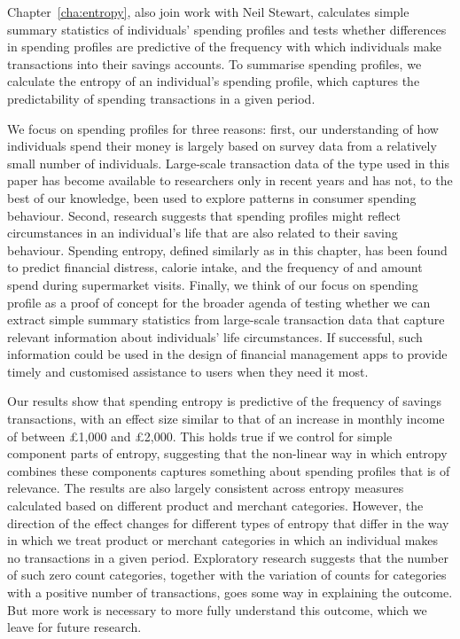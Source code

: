 Chapter~\ref{cha:entropy}, also join work with Neil Stewart, calculates simple
summary statistics of individuals' spending profiles and tests whether
differences in spending profiles are predictive of the frequency with which
individuals make transactions into their savings accounts. To summarise
spending profiles, we calculate the entropy of an individual's spending profile, which captures the predictability of spending transactions
in a given period.

We focus on spending profiles for three reasons: first, our understanding of
how individuals spend their money is largely based on survey data from a
relatively small number of individuals. Large-scale transaction data of the
type used in this paper has become available to researchers only in recent
years and has not, to the best of our knowledge, been used to explore patterns
in consumer spending behaviour. Second, research suggests that spending
profiles might reflect circumstances in an individual's life that are also
related to their saving behaviour. Spending entropy, defined similarly as in
this chapter, has been found to predict financial distress, calorie intake, and
the frequency of and amount spend during supermarket visits. Finally, we think
of our focus on spending profile as a proof of concept for the broader agenda
of testing whether we can extract simple summary statistics from large-scale
transaction data that capture relevant information about individuals' life
circumstances. If successful, such information could be used in the design of
financial management apps to provide timely and customised assistance to users
when they need it most.

Our results show that spending entropy is predictive of the frequency of
savings transactions, with an effect size similar to that of an increase in
monthly income of between \pounds1,000 and \pounds2,000. This holds true
if we control for simple component parts of entropy, suggesting that the
non-linear way in which entropy combines these components captures something
about spending profiles that is of relevance. The results are also largely
consistent across entropy measures calculated based on different product and
merchant categories. However, the direction of the effect changes for
different types of entropy that differ in the way in which we treat product or
merchant categories in which an individual makes no transactions in a given
period. Exploratory research suggests that the number of such zero count
categories, together with the variation of counts for categories with a
positive number of transactions, goes some way in explaining the outcome. But
more work is necessary to more fully understand this outcome, which we leave
for future research.

